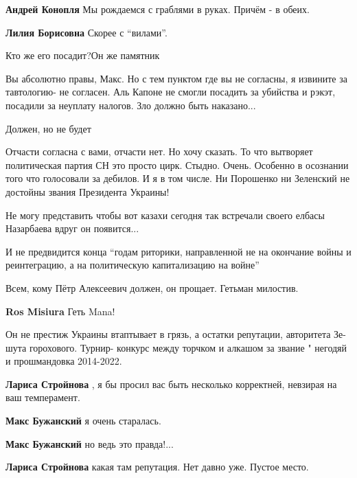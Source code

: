 \begin{itemize}
\begin{itemize} %
\textbf{Андрей Конопля} Мы рождаемся с граблями в руках. Причём - в обеих.

\textbf{Лилия Борисовна} Скорее с \enquote{вилами}.
\end{itemize} %

Кто же его посадит?Он же памятник

Вы абсолютно правы, Макс.
Но с тем пунктом где вы не согласны, я извините за тавтологию- не согласен.
Аль Капоне не смогли посадить за убийства и рэкэт, посадили за неуплату налогов.
Зло должно быть наказано...

Должен, но не будет


Отчасти согласна с вами, отчасти нет. Но хочу сказать. То что вытворяет
политическая партия СН это просто цирк. Стыдно. Очень. Особенно в осознании
того что голосовали за дебилов. И я в том числе. Ни Порошенко ни Зеленский не
достойны звания Президента Украины!

Не могу представить чтобы вот казахи сегодня так встречали своего елбасы Назарбаева вдруг он появится...

И не предвидится конца \enquote{годам риторики, направленной не на окончание войны и реинтеграцию, а на политическую капитализацию на войне}

Всем, кому Пётр Алексеевич должен, он прощает. Гетьман милостив.

\textbf{Ros Misiura} Геть Mana!


Он не престиж Украины втаптывает в грязь, а остатки репутации, авторитета
Зе-шута горохового. Турнир- конкурс между торчком и алкашом за звание " негодяй
и прошмандовка 2014-2022.

\begin{itemize} %
\textbf{Лариса Стройнова} , я бы просил вас быть несколько корректней, невзирая на ваш темперамент.

\textbf{Макс Бужанский} я очень старалась.

\textbf{Макс Бужанский} но ведь это правда!...

\textbf{Лариса Стройнова} какая там репутация. Нет давно уже. Пустое место.
\end{itemize} %


\end{itemize}
